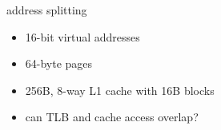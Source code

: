 \begin{frame}{address splitting}
\begin{itemize}
    \item 16-bit virtual addresses
    \item 64-byte pages
    \vspace{.5cm}
    \item 256B, 8-way L1 cache with 16B blocks
    \vspace{.5cm}
    \item can TLB and cache access overlap?
\end{itemize}
\end{frame}
